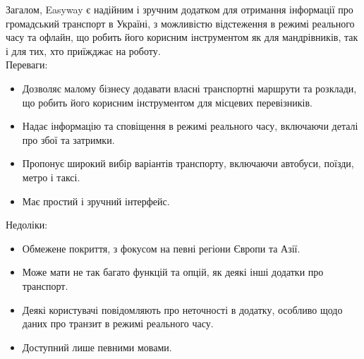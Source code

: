 Загалом, Easyway є надійним і зручним додатком для отримання 
інформації про громадський транспорт в Україні, з можливістю 
відстеження в режимі реального часу та офлайн, що робить його корисним 
інструментом як для мандрівників, так і для тих, хто приїжджає на 
роботу.\\


Переваги:
\begin{itemize}
    \item Дозволяє малому бізнесу додавати власні транспортні маршрути 
    та розклади, що робить його корисним інструментом для місцевих 
    перевізників.
    \item Надає інформацію та сповіщення в режимі реального часу, 
    включаючи деталі про збої та затримки.
    \item Пропонує широкий вибір варіантів транспорту, включаючи 
    автобуси, поїзди, метро і таксі.
    \item Має простий і зручний інтерфейс.
\end{itemize}

Недоліки:
\begin{itemize}
    \item Обмежене покриття, з фокусом на певні регіони Європи та Азії.
    \item Може мати не так багато функцій та опцій, як деякі інші 
    додатки про транспорт.
    \item Деякі користувачі повідомляють про неточності в додатку, 
    особливо щодо даних про транзит в режимі реального часу.
    \item Доступний лише певними мовами.
\end{itemize}
